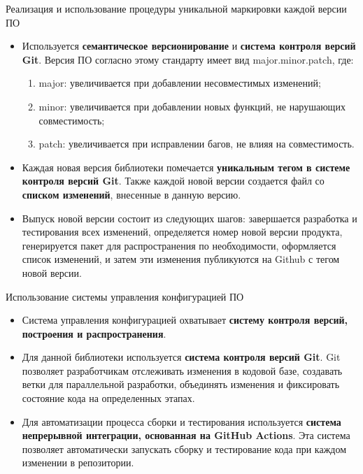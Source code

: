 \documentclass[10pt]{beamer}
\begin{document}
\begin{frame}{Реализация и использование процедуры уникальной маркировки каждой версии ПО}
    \begin{itemize}
        \item Используется \textbf{семантическое версионирование} и \textbf{система контроля версий Git}. Версия ПО согласно этому стандарту имеет вид major.minor.patch, где:

        \begin{enumerate}
            \item major: увеличивается при добавлении несовместимых изменений;
            \item minor: увеличивается при добавлении новых функций, не нарушающих совместимость;
            \item patch: увеличивается при исправлении багов, не влияя на совместимость.
        \end{enumerate}

        \item Каждая новая версия библиотеки помечается \textbf{уникальным тегом в системе контроля версий Git}. Также каждой новой версии создается файл со \textbf{списком изменений}, внесенные в данную версию.

        \item Выпуск новой версии состоит из следующих шагов: завершается разработка и тестирования всех изменений, определяется номер новой версии продукта, генерируется пакет для распространения по необходимости, оформляется список изменений, и затем эти изменения публикуются на Github с тегом новой версии.

    \end{itemize}

    \end{frame}


\begin{frame}{Использование системы управления конфигурацией ПО}
    \begin{itemize}
        \item  Система управления конфигурацией охватывает \textbf{систему контроля версий, построения и распространения}.

        \item Для данной библиотеки используется \textbf{система контроля версий Git}. Git позволяет разработчикам отслеживать изменения в кодовой базе, создавать ветки для параллельной разработки, объединять изменения и фиксировать состояние кода на определенных этапах.

        \item Для автоматизации процесса сборки и тестирования используется \textbf{система непрерывной интеграции, основанная на GitHub Actions}. Эта система позволяет автоматически запускать сборку и тестирование кода при каждом изменении в репозитории.
    \end{itemize}

\end{frame}
\end{document}
